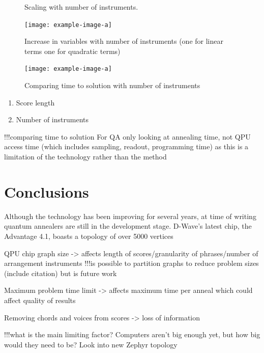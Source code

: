 \documentclass[12pt]{article}
\theoremstyle{definition}
\begin{document}
\begin{figure}
    \centering\small
    
    \caption{Scaling with number of instruments.}
    \label{fig:energy-scaling}
\end{figure}

\begin{figure}
    \texttt{[image: example-image-a]}
    \caption{Increase in variables with number of instruments (one for linear terms one for quadratic terms)}
    \label{fig:qubit-scaling}
\end{figure}

\begin{figure}
    \texttt{[image: example-image-a]}
    \caption{Comparing time to solution with number of instruments}
    \label{fig:times}
\end{figure}


\begin{enumerate}
    \item Score length
    \item Number of instruments
\end{enumerate}

!!!comparing time to solution
For QA only looking at annealing time, not QPU access time (which includes sampling, readout, programming time) as this is a limitation of the technology rather than the method

\section{Conclusions}


Although the technology has been improving for several years, at time of writing quantum annealers are still in the development stage. D-Wave's latest chip, the Advantage 4.1, boasts a topology of over \num{5000} vertices

QPU chip graph size -> affects length of scores/granularity of phrases/number of arrangement instruments
!!!is possible to partition graphs to reduce problem sizes (include citation) but is future work

Maximum problem time limit -> affects maximum time per anneal which could affect quality of results

Removing chords and voices from scores -> loss of information

!!!what is the main limiting factor?
Computers aren't big enough yet, but how big would they need to be? Look into new Zephyr topology
\end{document}
